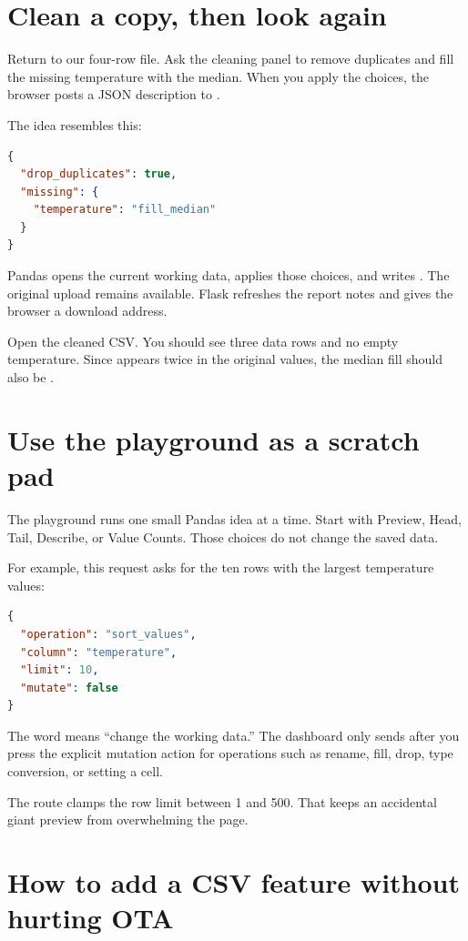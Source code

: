 \section{Clean a copy, then look again}

Return to our four-row file. Ask the cleaning panel to remove duplicates and fill the missing temperature with the median. When you apply the choices, the browser posts a JSON description to .

The idea resembles this:

\begin{lstlisting}[language=JSON,numbers=none]
{
  "drop_duplicates": true,
  "missing": {
    "temperature": "fill_median"
  }
}
\end{lstlisting}

Pandas opens the current working data, applies those choices, and writes . The original upload remains available. Flask refreshes the report notes and gives the browser a download address.

Open the cleaned CSV. You should see three data rows and no empty temperature. Since  appears twice in the original values, the median fill should also be .

\section{Use the playground as a scratch pad}

The playground runs one small Pandas idea at a time. Start with Preview, Head, Tail, Describe, or Value Counts. Those choices do not change the saved data.

For example, this request asks for the ten rows with the largest temperature values:

\begin{lstlisting}[language=JSON,numbers=none]
{
  "operation": "sort_values",
  "column": "temperature",
  "limit": 10,
  "mutate": false
}
\end{lstlisting}

The word  means ``change the working data.'' The dashboard only sends  after you press the explicit mutation action for operations such as rename, fill, drop, type conversion, or setting a cell.

The route clamps the row limit between 1 and 500. That keeps an accidental giant preview from overwhelming the page.

\section{How to add a CSV feature without hurting OTA}

